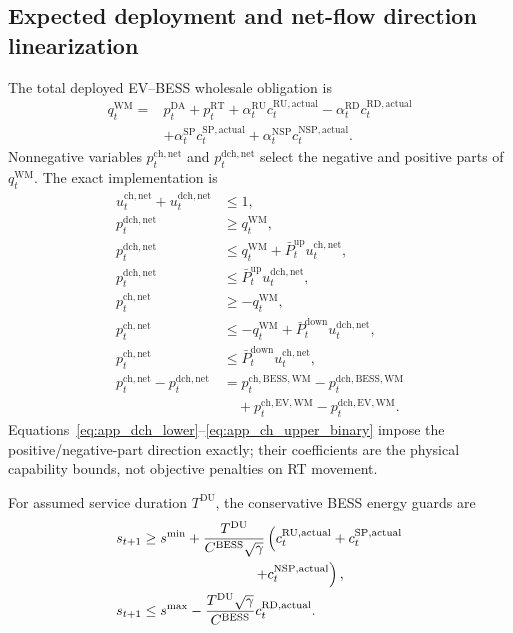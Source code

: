 \documentclass[final,5p,times]{elsarticle}
\newcommand{\EV}{\mathrm{EV}}
\newcommand{\BESS}{\mathrm{BESS}}
\newcommand{\DA}{\mathrm{DA}}
\newcommand{\RT}{\mathrm{RT}}
\newcommand{\RU}{\mathrm{RU}}
\newcommand{\RD}{\mathrm{RD}}
\newcommand{\SP}{\mathrm{SP}}
\newcommand{\NSP}{\mathrm{NSP}}
\newcommand{\WM}{\mathrm{WM}}
\newcommand{\net}{\mathrm{net}}
\newcommand{\ch}{\mathrm{ch}}
\newcommand{\dch}{\mathrm{dch}}
\newcommand{\actual}{\mathrm{actual}}
\begin{document}
\subsection{Expected deployment and net-flow direction linearization}
The total deployed EV--BESS wholesale obligation is
\begin{align}
q_t^{\WM}={}&p_t^{\DA}+p_t^{\RT}
+\alpha_t^{\RU}c_t^{\RU,\actual}
-\alpha_t^{\RD}c_t^{\RD,\actual}\nonumber\\
&+\alpha_t^{\SP}c_t^{\SP,\actual}
+\alpha_t^{\NSP}c_t^{\NSP,\actual}. \label{eq:app_obligation}
\end{align}
Nonnegative variables $p_t^{\ch,\net}$ and $p_t^{\dch,\net}$ select the
negative and positive parts of $q_t^{\WM}$. The exact
implementation is
\begin{align}
u_t^{\ch,\net}+u_t^{\dch,\net}&\le1, \label{eq:app_net_direction}\\
p_t^{\dch,\net}&\ge q_t^{\WM}, \label{eq:app_dch_lower}\\
p_t^{\dch,\net}&\le q_t^{\WM}+\bar P_t^{\mathrm{up}}u_t^{\ch,\net}, \label{eq:app_dch_upper_q}\\
p_t^{\dch,\net}&\le\bar P_t^{\mathrm{up}}u_t^{\dch,\net}, \label{eq:app_dch_upper_binary}\\
p_t^{\ch,\net}&\ge-q_t^{\WM}, \label{eq:app_ch_lower}\\
p_t^{\ch,\net}&\le-q_t^{\WM}+\bar P_t^{\mathrm{down}}u_t^{\dch,\net}, \label{eq:app_ch_upper_q}\\
p_t^{\ch,\net}&\le\bar P_t^{\mathrm{down}}u_t^{\ch,\net}, \label{eq:app_ch_upper_binary}\\
p_t^{\ch,\net}-p_t^{\dch,\net}
&=p_t^{\ch,\BESS,\WM}-p_t^{\dch,\BESS,\WM}\nonumber\\
&\quad+p_t^{\ch,\EV,\WM}-p_t^{\dch,\EV,\WM}. \label{eq:app_net_link}
\end{align}
Equations~\eqref{eq:app_dch_lower}--\eqref{eq:app_ch_upper_binary} impose the
positive/negative-part direction exactly; their coefficients are the physical
capability bounds, not objective penalties on RT movement.

For assumed service duration $T^{\mathrm{DU}}$, the conservative BESS energy
guards are
\begin{align}
s_{t+1}&\ge s^{\min}
+\frac{T^{\mathrm{DU}}}{C^{\BESS}\sqrt{\gamma}}
\left(c_t^{\RU,\actual}+c_t^{\SP,\actual}\right.\nonumber\\
&\hspace{28mm}\left.+c_t^{\NSP,\actual}\right),
\label{eq:app_duration_up}\\
s_{t+1}&\le s^{\max}
-\frac{T^{\mathrm{DU}}\sqrt{\gamma}}{C^{\BESS}}c_t^{\RD,\actual}.
\label{eq:app_duration_down}
\end{align}
\end{document}
